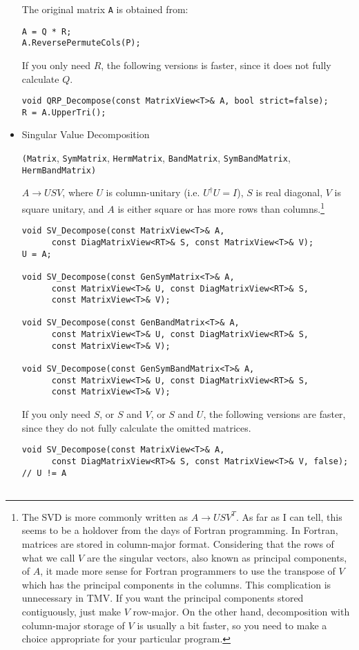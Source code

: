 \documentclass[twoside,letterpaper,11pt]{article}
\renewcommand{\tt}[1]{{\texttt {#1}}}
\begin{document}
\begin{itemize}
The original matrix \tt{A} is obtained from:
\begin{verbatim}
A = Q * R;
A.ReversePermuteCols(P);
\end{verbatim}

If you only need $R$, the following versions is faster, since it does
not fully calculate $Q$.
\begin{verbatim}
void QRP_Decompose(const MatrixView<T>& A, bool strict=false);
R = A.UpperTri();
\end{verbatim}

\item Singular Value Decomposition 

\tt{(Matrix}, \tt{SymMatrix}, \tt{HermMatrix}, \tt{BandMatrix}, \tt{SymBandMatrix}, \tt{HermBandMatrix)}

$A \rightarrow U S V$,
where $U$ is column-unitary (i.e. $U^\dagger U = I$),
$S$ is real diagonal, $V$ is square unitary, and $A$ is either square or 
has more rows than columns.\footnote{
The SVD is more commonly written as $A \rightarrow U S V^T$.  As far as I
can tell, this seems to be a holdover from the days of Fortran programming.  In Fortran, matrices
are stored in column-major format.  Considering that the rows of what we call $V$ are the 
singular vectors, also known as principal components, of $A$, it made more sense for 
Fortran programmers to use the transpose of $V$ which has the principal components in 
the columns.  This complication is unnecessary in TMV.  If you want the principal components
stored contiguously, just make $V$ row-major.  On the other hand, decomposition
with column-major storage of $V$
is usually a bit faster, so you need to make a choice appropriate for your particular program.}

\begin{verbatim}
void SV_Decompose(const MatrixView<T>& A, 
      const DiagMatrixView<RT>& S, const MatrixView<T>& V);
U = A;

void SV_Decompose(const GenSymMatrix<T>& A, 
      const MatrixView<T>& U, const DiagMatrixView<RT>& S, 
      const MatrixView<T>& V);

void SV_Decompose(const GenBandMatrix<T>& A,
      const MatrixView<T>& U, const DiagMatrixView<RT>& S,
      const MatrixView<T>& V);

void SV_Decompose(const GenSymBandMatrix<T>& A,
      const MatrixView<T>& U, const DiagMatrixView<RT>& S, 
      const MatrixView<T>& V);
\end{verbatim}

If you only need $S$, or $S$ and $V$, or $S$ and $U$, the following 
versions are faster, since they do
not fully calculate the omitted matrices.  
\begin{verbatim}
void SV_Decompose(const MatrixView<T>& A, 
      const DiagMatrixView<RT>& S, const MatrixView<T>& V, false);
// U != A


\end{verbatim}
\end{itemize}
\end{document}
